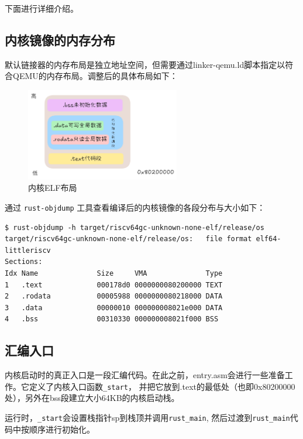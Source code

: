 下面进行详细介绍。

\subsection{内核镜像的内存分布}

默认链接器的内存布局是独立地址空间，但需要通过linker-qemu.ld脚本指定以符合QEMU的内存布局。调整后的具体布局如下：

\begin{figure}[htbp]
    \centering
    \includegraphics[width=0.6\textwidth]{../image/内核ELF布局.png}
    \caption{内核ELF布局}
    \label{fig:kernel-elf}
\end{figure}

通过 \texttt{rust-objdump} 工具查看编译后的内核镜像的各段分布与大小如下：

\begin{lstlisting}[language=Plain,caption={内核段分布信息}, label={lst:kernel-layout}]
$ rust-objdump -h target/riscv64gc-unknown-none-elf/release/os
target/riscv64gc-unknown-none-elf/release/os:   file format elf64-littleriscv
Sections:
Idx Name              Size     VMA              Type
1   .text             000178d0 0000000080200000 TEXT
2   .rodata           00005988 0000000080218000 DATA
3   .data             00000010 000000008021e000 DATA
4   .bss              00310330 000000008021f000 BSS
\end{lstlisting}

\subsection{汇编入口}

内核启动时的真正入口是一段汇编代码。在此之前，entry.asm会进行一些准备工作。它定义了内核入口函数\lstinline[language=Rust]{_start}，
并把它放到.text的最低处（也即0x80200000处），另外在bss段建立大小64KB的内核启动栈。

运行时，\lstinline[language=Rust]{_start}会设置栈指针sp到栈顶并调用\lstinline[language=Rust]{rust_main},
然后过渡到\lstinline[language=Rust]{rust_main}代码中按顺序进行初始化。


